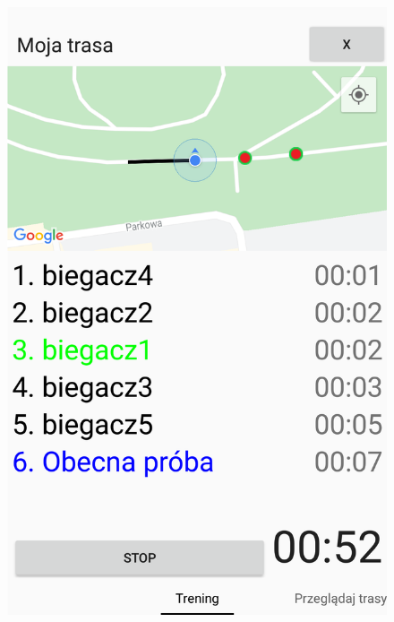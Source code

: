 \begin{figure}
\begin{minipage}{.5\textwidth}
  \includegraphics[width=.8\linewidth,frame]{img/rywalizacjaw2}
  \label{image:rywalizacjaw2}
\end{minipage}
\end{figure}